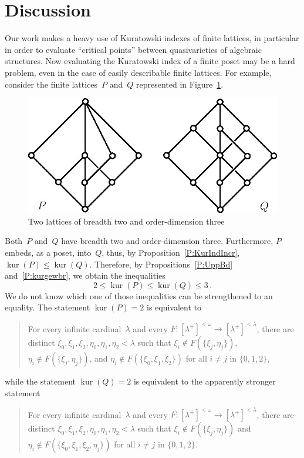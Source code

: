 \documentclass[psamsfonts,reqno]{amsart}
\theoremstyle{plain}
\theoremstyle{definition}
\theoremstyle{remark}
\numberwithin{equation}{section}
\numberwithin{figure}{section}
\newcommand{\gl}{\lambda}
\newcommand{\go}{\omega}
\DeclareMathOperator{\kur}{kur}
\newcommand{\set}[1]{\{#1\}}
\begin{document}
\section{Discussion}
Our work \cite{Larder} makes a heavy use of Kuratowski indexes of finite lattices, in particular in order to evaluate ``critical points'' between quasivarieties of algebraic structures. Now evaluating the Kuratowski index of a finite poset may be a hard problem, even in the case of easily describable finite lattices. For example, consider the finite lattices~$P$ and~$Q$ represented in Figure~\ref{Fig:lattices}.
\begin{figure}[htp]
\includegraphics{lattices.eps}
\caption{Two lattices of breadth two and order-dimension three}\label{Fig:lattices}
\end{figure}
Both~$P$ and~$Q$ have breadth two and order-dimension three. Furthermore, $P$ embeds, as a poset, into~$Q$, thus, by Proposition~\ref{P:KurIndIncr}, $\kur(P)\leq\kur(Q)$. Therefore, by Propositions~\ref{P:UppBd} and~\ref{P:kurgewbr}, we obtain the inequalities
 \[
 2\leq\kur(P)\leq\kur(Q)\leq 3\,.
 \]
We do not know which one of those inequalities can be strengthened to an equality. The statement $\kur(P)=2$ is equivalent to
\begin{quote}
For every infinite cardinal~$\gl$ and every $F\colon[\gl^+]^{<\go}\to[\gl^+]^{<\gl}$, there are distinct $\xi_0,\xi_1,\xi_2,\eta_0,\eta_1,\eta_2<\gl$ such that $\xi_i\notin F(\set{\xi_j,\eta_j})$, $\eta_i\notin F(\set{\xi_j,\eta_j})$, and $\eta_i\notin F(\set{\xi_0,\xi_1,\xi_2})$ for all $i\neq j$ in $\set{0,1,2}$,
\end{quote}
while the statement $\kur(Q)=2$ is equivalent to the apparently stronger statement
\begin{quote}
For every infinite cardinal~$\gl$ and every $F\colon[\gl^+]^{<\go}\to[\gl^+]^{<\gl}$, there are distinct $\xi_0,\xi_1,\xi_2,\eta_0,\eta_1,\eta_2<\gl$ such that $\xi_i\notin F(\set{\xi_j,\eta_j})$ and $\eta_i\notin F(\set{\xi_0,\xi_1,\xi_2,\eta_j})$ for all $i\neq j$ in $\set{0,1,2}$.
\end{quote}
\end{document}
